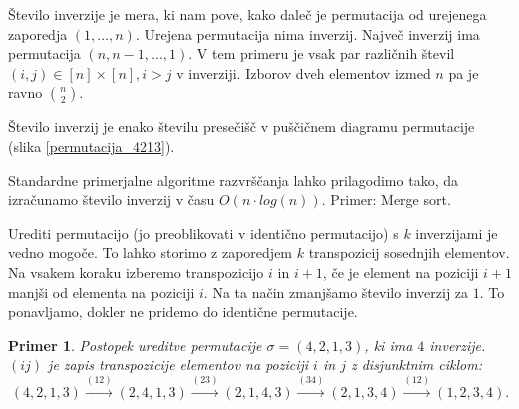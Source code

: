 \documentclass[a4paper, 12pt]{book}
\newtheorem{primer}{Primer}[chapter]
\begin{document}
Število inverzije je mera, ki nam pove, kako daleč je permutacija od urejenega zaporedja $(1, ..., n)$. Urejena permutacija nima inverzij. Največ inverzij ima permutacija $(n, n-1, ..., 1)$. V tem primeru je vsak par različnih števil $(i, j) \in [n] \times [n], i > j$ v inverziji. Izborov dveh elementov izmed $n$ pa je ravno $\binom{n}{2}$.

Število inverzij je enako številu presečišč v puščičnem diagramu permutacije (slika \ref{permutacija_4213}).

Standardne primerjalne algoritme razvrščanja lahko prilagodimo tako, da izračunamo število inverzij v času $O(n \cdot log(n))$. Primer: Merge sort.

Urediti permutacijo (jo preoblikovati v identično permutacijo) s $k$ inverzijami je vedno mogoče. To lahko storimo z zaporedjem $k$ transpozicij sosednjih elementov. Na vsakem koraku izberemo transpozicijo $i$ in $i+1$, če je element na poziciji $i+1$ manjši od elementa na poziciji $i$. Na ta način zmanjšamo število inverzij za $1$. To ponavljamo, dokler ne pridemo do identične permutacije.

\begin{primer}
    Postopek ureditve permutacije $\sigma = (4, 2, 1, 3)$, ki ima $4$ inverzije. $(i j)$ je zapis transpozicije elementov na poziciji $i$ in $j$ z disjunktnim ciklom:
    \[
        (4, 2, 1, 3) \overset{(12)}{\rightarrow} (2, 4, 1, 3) \overset{(23)}{\rightarrow} (2, 1, 4, 3) \overset{(34)}{\rightarrow} (2, 1, 3, 4) \overset{(12)}{\rightarrow} (1, 2, 3, 4).
    \]
\end{primer}
\end{document}
